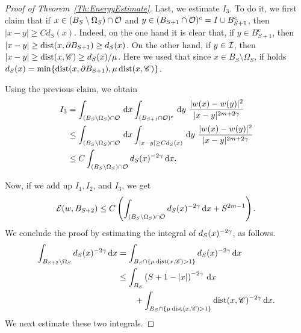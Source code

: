 \begin{proof}[Proof of Theorem~\ref{Th:EnergyEstimate}]
	Last, we estimate $I_3$. To do it, we first claim that if $x\in (B_S\setminus \Omega_S) \cap \mathcal{O}$ and $y\in (B_{S+1}\cap \mathcal{O})^c = I \cup B_{S+1}^c$, then $|x-y|\geq C d_S(x)$. Indeed, on the one hand it is clear that, if $y\in B_{S+1}^c$, then $|x-y|\geq \operatorname{dist}(x,\partial B_{S+1})\geq d_S(x)$. On the other hand, if $y\in \mathcal{I}$, then $|x-y|\geq \operatorname{dist}(x,\mathscr{C}) \geq  d_S(x) / \mu$. Here we used that since $x\in B_S\setminus \Omega_S $, if holds $d_S(x)=\min \{\operatorname{dist}(x,\partial B_{S+1}), \mu \operatorname{dist} (x, \mathscr{C})\}$. 
	
	Using the previous claim, we obtain
	\begin{align*}
	I_3 &= \int_{(B_S\setminus \Omega_S)\cap \mathcal{O}} \,\mathrm{d} x \int_{(B_{S+1}\cap \mathcal{O})^c} \,\mathrm{d} y \  \frac{|w(x)-w(y)|^2}{|x-y|^{2m+2\gamma}} \\
	&\leq \int_{(B_S\setminus \Omega_S)\cap \mathcal{O}} \,\mathrm{d} x \int_{|x-y|\geq C d_S(x)} \,\mathrm{d} y \ \frac{|w(x)-w(y)|^2}{|x-y|^{2m+2\gamma}} \\
	&\leq C \int_{(B_S\setminus \Omega_S)\cap \mathcal{O}}  d_S(x)^{-2\gamma} \,\mathrm{d} x .
	\end{align*}
	
	Now, if we add up $I_1, I_2$, and $I_3$, we get
	\begin{equation}
		\label{Eq:EnergyEstimateProofLastEstimate}
	\mathcal{E}(w,B_{S+2}) \leq C \left( \int_{(B_S\setminus \Omega_S)\cap \mathcal{O}}  d_S(x)^{-2\gamma} \,\mathrm{d} x + S^{2m-1}\right).
	\end{equation}
	We conclude the proof by estimating the integral of $d_S(x)^{-2\gamma}$, as follows.
	\begin{align*}
	\int_{B_{S+2}\setminus \Omega_S} d_S(x)^{-2\gamma} \,\mathrm{d} x &= \int_{B_{S}\cap \{\mu \operatorname{dist}(x,\mathscr{C})>1\}} d_S(x)^{-2\gamma} \,\mathrm{d} x \\
	& \leq \int_{B_S} \left( S+1-|x| \right)^{-2\gamma} \,\mathrm{d} x \\
	& \quad \quad + \int_{B_{S}\cap \{\mu \operatorname{dist}(x,\mathscr{C})>1\}} \operatorname{dist}(x,\mathscr{C})^{-2\gamma} \,\mathrm{d} x.
	\end{align*}
	We next estimate these two integrals.
	

\end{proof}
